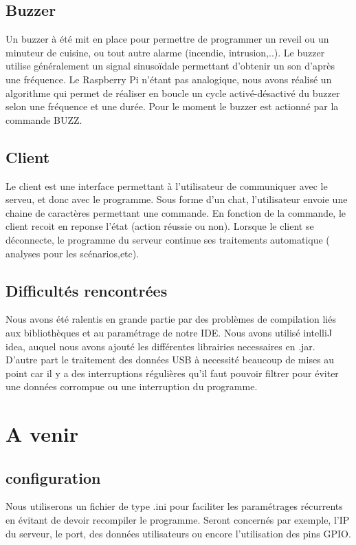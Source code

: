 \documentclass[12pt,a4paper]{article}
\begin{document}
  \subsection*{Buzzer}
    Un buzzer à été mit en place pour permettre de programmer un reveil ou un minuteur de cuisine, ou tout autre alarme (incendie, intrusion,..).
    Le buzzer utilise généralement un signal sinusoïdale permettant d'obtenir un son d'après une fréquence.
    Le Raspberry Pi n'étant pas analogique, nous avons réalisé un algorithme qui permet de réaliser en boucle un cycle activé-désactivé
    du buzzer selon une fréquence et une durée.
    Pour le moment le buzzer est actionné par la commande BUZZ.
  \subsection*{Client}
    Le client est une interface permettant à l'utilisateur de communiquer avec le serveu, et donc avec le
    programme. Sous forme d'un chat, l'utilisateur envoie une chaine de caractères permettant une commande.
    En fonction de la commande, le client recoit en reponse l'état (action réussie ou non).
    Lorsque le client se déconnecte, le programme du serveur continue ses traitements automatique ( analyses pour les scénarios,etc).
  \subsection*{Difficultés rencontrées}
    Nous avons été ralentis en grande partie par des problèmes de compilation liés aux bibliothèques et au paramétrage de notre IDE.
    Nous avons utilisé intelliJ idea, auquel nous avons ajouté les différentes librairies necessaires en .jar.
    \\
    D'autre part le traitement des données USB à necessité beaucoup de mises au point car il y a des interruptions régulières qu'il faut
    pouvoir filtrer pour éviter une données corrompue ou une interruption du programme.

\section*{A venir}
  \subsection*{configuration}
  Nous utiliserons un fichier de type .ini pour faciliter les paramétrages récurrents en évitant de devoir recompiler le programme.
  Seront concernés par exemple, l'IP du serveur, le port, des données utilisateurs ou encore l'utilisation des pins GPIO.
\end{document}
